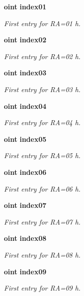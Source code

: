 \begin{CompactItemize}
{\bf oint} {\bf index01}
\begin{CompactList}\small\item\em First entry for RA=01 h. \item\end{CompactList}\item 
{\bf oint} {\bf index02}
\begin{CompactList}\small\item\em First entry for RA=02 h. \item\end{CompactList}\item 
{\bf oint} {\bf index03}
\begin{CompactList}\small\item\em First entry for RA=03 h. \item\end{CompactList}\item 
{\bf oint} {\bf index04}
\begin{CompactList}\small\item\em First entry for RA=04 h. \item\end{CompactList}\item 
{\bf oint} {\bf index05}
\begin{CompactList}\small\item\em First entry for RA=05 h. \item\end{CompactList}\item 
{\bf oint} {\bf index06}
\begin{CompactList}\small\item\em First entry for RA=06 h. \item\end{CompactList}\item 
{\bf oint} {\bf index07}
\begin{CompactList}\small\item\em First entry for RA=07 h. \item\end{CompactList}\item 
{\bf oint} {\bf index08}
\begin{CompactList}\small\item\em First entry for RA=08 h. \item\end{CompactList}\item 
{\bf oint} {\bf index09}
\begin{CompactList}\small\item\em First entry for RA=09 h. \item\end{CompactList}\item 

\end{CompactItemize}

